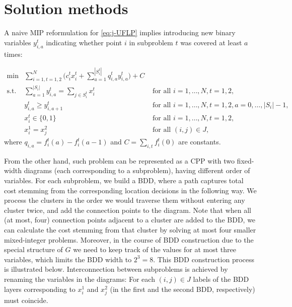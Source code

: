 \documentclass[11pt]{article}
\begin{document}
\section{Solution methods}
\label{sec:j-UFLP-sol}
A naive MIP reformulation for \eqref{eq:j-UFLP} implies introducing new binary
variables \(y_{i,a}^t\) indicating whether point \(i\) in subproblem \(t\) was covered
at least \(a\) times:

\begin{subequations}\label{eq:j-UFLP-MIP}
\begin{align}
  \min & \sum_{i=1, t=1,2}^N \Big(c^t_i x^t_i + \sum_{a=1}^{|S_i^t|}q_{i,a}^t y^t_{i,a}\Big)+C&\\
    \textrm{s.t. } & \sum_{a=1}^{|S_i|} y_{i,a}^t = \sum_{j\in S^t_i} x^t_i& \textrm{ for all } i=1,\ldots, N, t=1,2,\\
    & y^t_{i,a} \geq y^t_{i, a+1} & \textrm{ for all }i=1, \ldots, N, t=1,2, a=0,\ldots,|S_i|-1,\\
    & x^t_i\in\{0,1\} & \textrm{ for all } i=1,\ldots,N, t=1,2,\\
    & x^1_i = x^2_j & \textrm{ for all } (i, j)\in J,\label{eq:link-MIP}
\end{align}
\end{subequations}
where \(q_{i,a}=f_i^t(a)-f_i^t(a-1)\) and \(C=\sum_{i,t} f_i^t(0)\) are constants.

From the other hand, such problem can be represented as a CPP with two
fixed-width diagrams (each corresponding to a subproblem), having different
order of variables. For each subproblem, we build a BDD, where a path captures
total cost stemming from the corresponding location decisions in the following
way. We process the clusters in the order we would traverse them without
entering any cluster twice, and add the connection points to the diagram. Note
that when all (at most, four) connection points adjacent to a cluster are added
to the BDD, we can calculate the cost stemming from that cluster by solving at
most four smaller mixed-integer problems. Moreover, in the course of BDD
construction due to the special structure of \(G\) we need to keep track of the
values for at most three variables, which limits the BDD width to \(2^3=8\). This
BDD construction process is illustrated below. Interconnection between
subproblems is achieved by renaming the variables in the diagrams: For each \((i,
j)\in J\) labels of the BDD layers corresponding to \(x_i^1\) and \(x_j^2\) (in the
first and the second BDD, respectively) must coincide.
\end{document}

